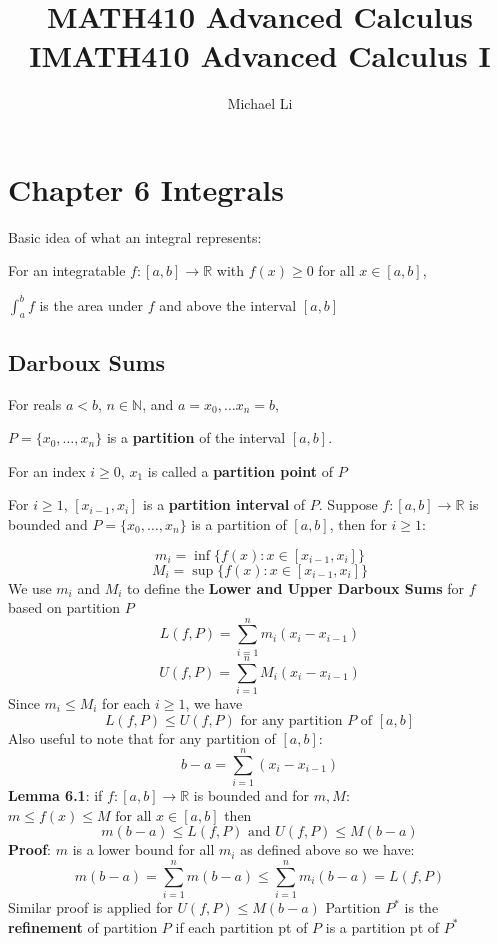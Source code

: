 \documentclass{article}
\date{}
\title{MATH410 Advanced Calculus I}
\begin{document}
 
  \author{Michael Li}
  \title{MATH410 Advanced Calculus I}
  \maketitle
  \tableofcontents
  \newpage
  \section{Chapter 6 Integrals}
  Basic idea of what an integral represents:

  For an integratable $f \colon [a,b] \rightarrow \mathbb{R}$ with $f(x) \geq 0$ for all $x \in [a, b]$,
  
  $\int_a^bf$ is the area under $f$ and above the interval $[a, b]$
  \subsection{Darboux Sums}
  For reals $a < b$, $n \in \mathbb{N}$, and $a=x_0, \ldots x_{n} = b$,

  $P = \{x_0, \ldots, x_n\}$ is a \textbf{partition} of the interval $[a, b]$.

  For an index $i \geq 0$, $x_1$ is called a \textbf{partition point} of $P$

  For $i \geq 1$, $[x_{i-1}, x_i]$ is a \textbf{partition interval} of $P$.
  \newline \newline
  Suppose $f \colon [a, b] \rightarrow \mathbb{R}$ is bounded and $P = \{x_0, \ldots, x_n\}$ is a partition of $[a, b]$, then for $i \geq 1$:

  \[m_i = \inf\{f(x) \colon x \in [x_{i-1}, x_i]\}\]
  \[M_i = \sup\{f(x) \colon x \in [x_{i-1}, x_i]\}\]
  We use $m_i$ and $M_i$ to define the \textbf{Lower and Upper Darboux Sums} for $f$ based on partition $P$
  \[L(f, P) = \sum_{i = 1}^{n}m_i(x_i - x_{i-1})\]
  \[U(f, P) = \sum_{i = 1}^{n}M_i(x_i - x_{i-1})\]
  Since $m_i \leq M_i$ for each $i \geq 1$, we have
  \[L(f, P) \leq U(f, P) \text{ for any partition } P \text{ of } [a,b]\]
  Also useful to note that for any partition of $[a, b]$:
  \[b - a = \sum_{i = 1}^{n}(x_i - x_{i-1})\]
  \textbf{Lemma 6.1}: if $f \colon [a, b] \rightarrow \mathbb{R}$ is bounded and for $m, M$: $m \leq f(x) \leq M \text{ for all } x \in [a,b]$ then 
  \[m(b-a) \leq L(f, P) \text{ and } U(f, P) \leq M(b-a)\]
  \textbf{Proof}: $m$ is a lower bound for all $m_i$ as defined above so we have:
  \[m(b-a) = \sum_{i = 1}^{n}m(b-a) \leq \sum_{i=1}^{n}{m_i}(b-a) = L(f, P)\]
  Similar proof is applied for $U(f, P) \leq M(b-a)$ \newline \newline
  Partition $P^*$ is the \textbf{refinement} of partition $P$ if each partition pt of $P$ is a partition pt of $P^*$
\end{document}
